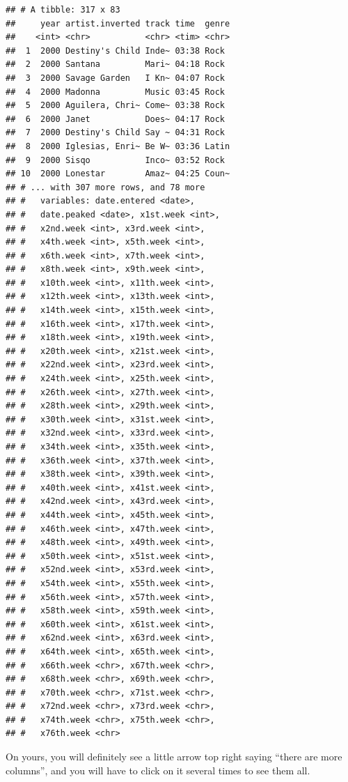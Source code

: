 \documentclass[]{tufte-book}
\theoremstyle{definition}
\theoremstyle{definition}
\theoremstyle{definition}
\theoremstyle{remark}
\begin{document}
\begin{verbatim}
## # A tibble: 317 x 83
##     year artist.inverted track time  genre
##    <int> <chr>           <chr> <tim> <chr>
##  1  2000 Destiny's Child Inde~ 03:38 Rock 
##  2  2000 Santana         Mari~ 04:18 Rock 
##  3  2000 Savage Garden   I Kn~ 04:07 Rock 
##  4  2000 Madonna         Music 03:45 Rock 
##  5  2000 Aguilera, Chri~ Come~ 03:38 Rock 
##  6  2000 Janet           Does~ 04:17 Rock 
##  7  2000 Destiny's Child Say ~ 04:31 Rock 
##  8  2000 Iglesias, Enri~ Be W~ 03:36 Latin
##  9  2000 Sisqo           Inco~ 03:52 Rock 
## 10  2000 Lonestar        Amaz~ 04:25 Coun~
## # ... with 307 more rows, and 78 more
## #   variables: date.entered <date>,
## #   date.peaked <date>, x1st.week <int>,
## #   x2nd.week <int>, x3rd.week <int>,
## #   x4th.week <int>, x5th.week <int>,
## #   x6th.week <int>, x7th.week <int>,
## #   x8th.week <int>, x9th.week <int>,
## #   x10th.week <int>, x11th.week <int>,
## #   x12th.week <int>, x13th.week <int>,
## #   x14th.week <int>, x15th.week <int>,
## #   x16th.week <int>, x17th.week <int>,
## #   x18th.week <int>, x19th.week <int>,
## #   x20th.week <int>, x21st.week <int>,
## #   x22nd.week <int>, x23rd.week <int>,
## #   x24th.week <int>, x25th.week <int>,
## #   x26th.week <int>, x27th.week <int>,
## #   x28th.week <int>, x29th.week <int>,
## #   x30th.week <int>, x31st.week <int>,
## #   x32nd.week <int>, x33rd.week <int>,
## #   x34th.week <int>, x35th.week <int>,
## #   x36th.week <int>, x37th.week <int>,
## #   x38th.week <int>, x39th.week <int>,
## #   x40th.week <int>, x41st.week <int>,
## #   x42nd.week <int>, x43rd.week <int>,
## #   x44th.week <int>, x45th.week <int>,
## #   x46th.week <int>, x47th.week <int>,
## #   x48th.week <int>, x49th.week <int>,
## #   x50th.week <int>, x51st.week <int>,
## #   x52nd.week <int>, x53rd.week <int>,
## #   x54th.week <int>, x55th.week <int>,
## #   x56th.week <int>, x57th.week <int>,
## #   x58th.week <int>, x59th.week <int>,
## #   x60th.week <int>, x61st.week <int>,
## #   x62nd.week <int>, x63rd.week <int>,
## #   x64th.week <int>, x65th.week <int>,
## #   x66th.week <chr>, x67th.week <chr>,
## #   x68th.week <chr>, x69th.week <chr>,
## #   x70th.week <chr>, x71st.week <chr>,
## #   x72nd.week <chr>, x73rd.week <chr>,
## #   x74th.week <chr>, x75th.week <chr>,
## #   x76th.week <chr>
\end{verbatim}

On yours, you will definitely see a little arrow top right saying
``there are more columns'', and you will have to click on it several
times to see them all.
\end{document}
